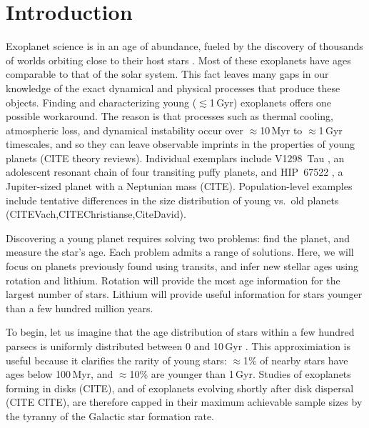 \documentclass[11pt,twocolumn,tighten]{aastex63}
\begin{document}

\section{Introduction}
\label{sec:intro}

Exoplanet science is in an age of abundance, fueled by the discovery
of thousands of worlds orbiting close to their host stars
\citep{Borucki10,2015JATIS...1a4003R}.
Most of these exoplanets have ages comparable to that of the solar
system.
This fact leaves many gaps in our knowledge of the exact dynamical
and physical processes that produce these objects.
Finding and characterizing young ($\lesssim$1\,Gyr) exoplanets offers
one possible workaround.
The reason is that processes such as thermal cooling, atmospheric
loss, and dynamical instability occur over $\approx$10\,Myr to
$\approx$1\,Gyr timescales, and so they can leave observable imprints in
the properties of young planets (CITE theory reviews).
Individual exemplars include V1298~Tau \citep{David_2019}, an
adolescent resonant chain of four transiting puffy planets,
and HIP~67522 \citep{Rizzuto_2020}, a Jupiter-sized planet with a
Neptunian mass (CITE).
Population-level examples include tentative differences in the size
distribution of young vs.~old planets
(CITEVach,CITEChristianse,CiteDavid).

Discovering a young planet requires solving two problems: find the
planet, and measure the star's age.  Each problem admits a range of
solutions.  Here, we will focus on planets previously found using
transits, and infer new stellar ages using rotation and lithium.
Rotation will provide the most age information for the largest number
of stars.  Lithium will provide useful information for
stars younger than a few hundred million years.

To begin, let us imagine that the age distribution of stars within a
few hundred parsecs is uniformly distributed between 0 and 10\,Gyr
\citep[e.g.][]{Nordstrom_2004}.  
This approximiation is useful because it clarifies the rarity of young
stars:
$\approx$1\% of nearby stars have ages below 100\,Myr,
and $\approx$10\% are younger than 1\,Gyr.
Studies of exoplanets forming in disks (CITE), and of exoplanets
evolving shortly after disk dispersal (CITE CITE), are therefore
capped in their maximum achievable sample sizes by the tyranny of the
Galactic star formation rate.
\end{document}
